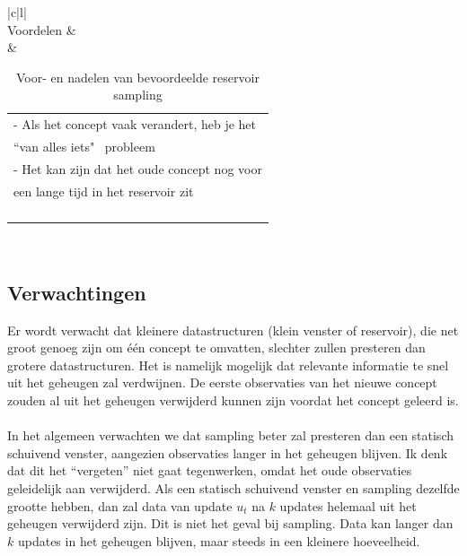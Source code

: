 \begin{table}[!ht]
\begin{tabular}{|c|l|}
\hline
{} \\ \hline
Voordelen &  \\ \hline
{} & \begin{tabular}[c]{@{}l@{}}- Als het concept vaak verandert, heb je het\\ \phantom{-} ``van alles iets" \ probleem\\ - Het kan zijn dat het oude concept nog voor\\ \phantom{-} een lange tijd in het reservoir zit\\ \phantom{test} \\ \phantom{test}\\ \phantom{test}\\ \phantom{test}\end{tabular} \\ \hline
\end{tabular}
\caption{Voor- en nadelen van bevoordeelde reservoir sampling}
\label{tab:voor- en nadelen van biased reservoir sampling}
\end{table}
\newpage
\subsection{Verwachtingen}
Er wordt verwacht dat kleinere datastructuren (klein venster of reservoir), die net groot genoeg zijn om één concept te omvatten, slechter zullen presteren dan grotere datastructuren. Het is namelijk mogelijk dat relevante informatie te snel uit het geheugen zal verdwijnen. De eerste observaties van het nieuwe concept zouden al uit het geheugen verwijderd kunnen zijn voordat het concept geleerd is.
\\\\
In het algemeen verwachten we dat sampling beter zal presteren dan een statisch schuivend venster, aangezien observaties langer in het geheugen blijven. Ik denk dat dit het “vergeten” niet gaat tegenwerken, omdat het oude observaties geleidelijk aan verwijderd. Als een statisch schuivend venster en sampling dezelfde grootte hebben, dan zal data van update $u_t$ na $k$ updates helemaal uit het geheugen verwijderd zijn. Dit is niet het geval bij sampling. Data kan langer dan $k$ updates in het geheugen blijven, maar steeds in een kleinere hoeveelheid.
